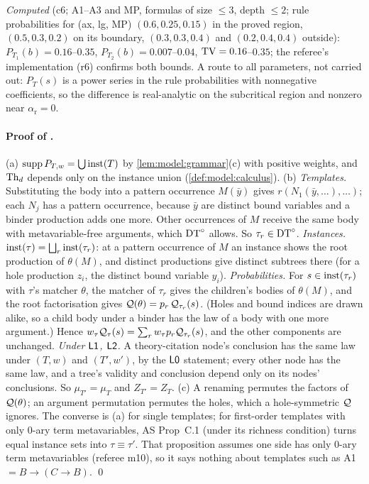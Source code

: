 \emph{Computed} (c6; A1--A3 and MP, formulas of size $\le3$, depth $\le2$; rule probabilities for (ax, lg, MP) $(0.6,0.25,0.15)$ in the proved region, $(0.5,0.3,0.2)$ on its boundary, $(0.3,0.3,0.4)$ and $(0.2,0.4,0.4)$ outside): $P_{T_1}(b)=0.16$--$0.35$, $P_{T_2}(b)=0.007$--$0.04$, $\mathrm{TV}=0.16$--$0.35$; the referee's implementation (r6) confirms both bounds. A route to all parameters, not carried out: $P_T(s)$ is a power series in the rule probabilities with nonnegative coefficients, so the difference is real-analytic on the subcritical region and nonzero near $\alpha_{\mathrm r}=0$.

\paragraph{Proof of .}
(a) $\operatorname{supp}P_{T,w}=\bigcup\mathrm{inst}(T)$ by \cref{lem:model:grammar}(c) with positive weights, and $\mathrm{Th}_d$ depends only on the instance union (\cref{def:model:calculus}).
(b) \emph{Templates.} Substituting the body into a pattern occurrence $M(\bar y)$ gives $r(N_1(\bar y,\dots),\dots)$; each $N_j$ has a pattern occurrence, because $\bar y$ are distinct bound variables and a binder production adds one more. Other occurrences of $M$ receive the same body with metavariable-free arguments, which $\mathrm{DT}^{\circ}$ allows. So $\tau_r\in\mathrm{DT}^{\circ}$.
\emph{Instances.} $\mathrm{inst}(\tau)=\bigsqcup_r\mathrm{inst}(\tau_r)$: at a pattern occurrence of $M$ an instance shows the root production of $\theta(M)$, and distinct productions give distinct subtrees there (for a hole production $z_i$, the distinct bound variable $y_i$).
\emph{Probabilities.} For $s\in\mathrm{inst}(\tau_r)$ with $\tau$'s matcher $\theta$, the matcher of $\tau_r$ gives the children's bodies of $\theta(M)$, and the root factorisation gives $\mathcal{Q}(\theta)=p_r\,\mathcal{Q}_{\tau_r}(s)$. (Holes and bound indices are drawn alike, so a child body under a binder has the law of a body with one more argument.) Hence $w_\tau\mathcal{Q}_\tau(s)=\sum_rw_\tau p_r\mathcal{Q}_{\tau_r}(s)$, and the other components are unchanged.
\emph{Under $\mathord{\mathsf{L1}}$, $\mathord{\mathsf{L2}}$.} A theory-citation node's conclusion has the same law under $(T,w)$ and $(T',w')$, by the $\mathord{\mathsf{L0}}$ statement; every other node has the same law, and a tree's validity and conclusion depend only on its nodes' conclusions. So $\mu_{T'}=\mu_T$ and $Z_{T'}=Z_T$.
(c) A renaming permutes the factors of $\mathcal{Q}(\theta)$; an argument permutation permutes the holes, which a hole-symmetric $\mathcal{Q}$ ignores. The converse is (a) for single templates; for first-order templates with only $0$-ary term metavariables, AS Prop~C.1 (under its richness condition) turns equal instance sets into $\tau\equiv\tau'$. That proposition assumes one side has only $0$-ary term metavariables (referee m10), so it says nothing about templates such as A1 $=B\to(C\to B)$. \qed

